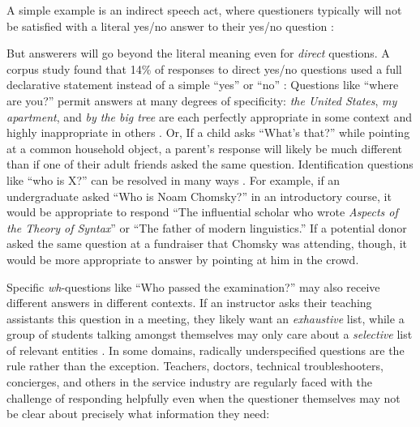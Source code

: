 \documentclass[11pt, floatsintext]{apa6}
\begin{document}
A simple example is an indirect speech act, where questioners typically will not be satisfied with a literal yes/no answer to their yes/no question \cite{Clark79_IndirectSpeechActs}:  
 
But answerers will go beyond the literal meaning even for \emph{direct} questions. 
A corpus study found that 14\% of responses to direct yes/no questions used a full declarative statement instead of a simple ``yes'' or ``no'' \cite{DeMarneffeGrimmPotts09_IndirectAnswersCorpus}:
Questions like ``where are you?'' permit answers at many degrees of specificity: \emph{the United States}, \emph{my apartment}, and \emph{by the big tree} are each perfectly appropriate in some context and highly inappropriate in others \cite{Potts12_CardsDialogueCorpus}. 
Or, If a child asks ``What's that?'' while pointing at a common household object, a parent's response will likely be much different than if one of their adult friends asked the same question. 
Identification questions like ``who is X?'' can be resolved in many ways  \cite{BoerLycan75_KnowingWho, Gerbrandy00_Identity, Aloni05_ConceptualCovers}. 
For example, if an undergraduate asked ``Who is Noam Chomsky?'' in an introductory course, it would be appropriate to respond ``The influential scholar who wrote \emph{Aspects of the Theory of Syntax}'' or ``The father of modern linguistics.'' 
If a potential donor asked the same question at a fundraiser that Chomsky was attending, though, it would be more appropriate to answer by pointing at him in the crowd. 

Specific \emph{wh}-questions like ``Who passed the examination?'' may also receive different answers in different contexts. 
If an instructor asks their teaching assistants this question in a meeting, they likely want an \emph{exhaustive} list, while a group of students talking amongst themselves may only care about a \emph{selective} list of relevant entities \cite{SchulzVanRooij06_ExhaustiveInterpretation}.
In some domains, radically underspecified questions are the rule rather than the exception. 
Teachers, doctors, technical troubleshooters, concierges, and others in the service industry are regularly faced with the challenge of responding helpfully even when the questioner themselves may not be clear about precisely what information they need:
\end{document}

